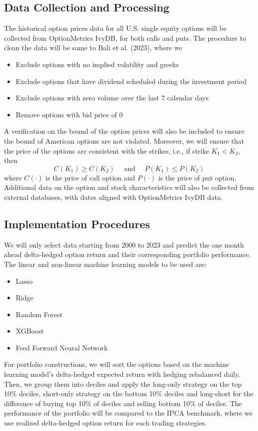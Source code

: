 \documentclass[oneside, 12pt]{article}
\newcommand*{\1}{\text{\scalebox{1.1}{\usefont{U}{bbold}{m}{n}1}}}
\begin{document}
\subsection{Data Collection and Processing}
The historical option prices data for all U.S. single equity options will be collected from OptionMetrics IvyDB, for both calls and puts. The procedure to clean the data will be same to Bali et al. (2023), where we
\begin{itemize}
\item Exclude options with no implied volatility and greeks 
\item Exclude options that have dividend scheduled during the investment period
\item Exclude options with zero volume over the last 7 calendar days
\item Remove options with bid price of 0
\end{itemize}
A verification on the bound of the option prices will also be included to ensure the bound of American options are not violated. Moreover, we will ensure that the price of the options are consistent with the strikes, i.e., if strike $K_1 < K_2$, then
$$
C(K_1) \geq C(K_2) \quad \text{ and } \quad P(K_1) \leq P(K_2)
$$
 where $C(\cdot)$ is the price of call option and $P(\cdot)$ is the price of put option. Additional data on the option and stock characteristics will also be collected from external databases, with dates aligned with OptionMetrics IvyDB data.

\subsection{Implementation Procedures}
We will only select data starting from 2000 to 2023 and predict the one month ahead delta-hedged option return and their corresponding portfolio performance. The linear and non-linear machine learning models to be used are:
\begin{itemize}
\item Lasso 
\item Ridge
\item Random Forest
\item XGBoost
\item Feed Forward Neural Network
\end{itemize}
For portfolio constructions, we will sort the options based on the machine learning model's delta-hedged expected return with hedging rebalanced daily. Then, we group them into deciles and apply the long-only strategy on the top 10\% deciles, short-only strategy on the bottom 10\% deciles and long-short for the difference of buying top 10\% of deciles and selling bottom 10\% of deciles. The performance of the portfolio will be compared to the IPCA benchmark, where we use realized delta-hedged option return for each trading strategies. 
\end{document}
